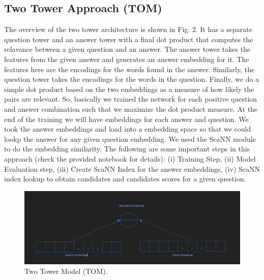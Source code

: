 \documentclass[11pt,a4paper]{article}
\begin{document}
\subsection{Two Tower Approach (TOM)}
The overview of the two tower architecture is shown in Fig. 2. It has a separate question tower and an answer tower with a final dot product that computes the relavance between a given question and an answer. The answer tower takes the features from the given answer and generates an answer embedding for it. The features here are the encodings for the words found in the answer. Similarly, the question tower takes the encodings for the words in the question.  Finally, we do a simple dot product based on the two embeddings as a measure of how likely the pairs are relevant. So, basically we trained the network for each positive question and answer combination such that we maximize the dot product measure. At the end of the training we will have embeddings for each answer and question. We took the answer embeddings and load into a embedding space so that we could lookp the answer for any given question embedding. We used the ScaNN module to do the embedding similarity. The following are some important steps in this approach (check the provided notebook for details): (i) Training Step,  (ii) Model Evaluation step, (iii) Create ScaNN Index for the answer embeddings, (iv) ScaNN index lookup to obtain candidates and candidates scores for a given question. 


\begin{figure}
  \includegraphics[width=\linewidth]{two-tower.png}
  \caption{Two Tower Model (TOM).}
  \label{fig:two-tower model}
\end{figure}
\end{document}
